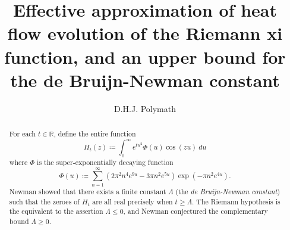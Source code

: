 \documentclass[a4paper,11pt,twoside]{amsart}
\newcommand\R{\mathbb{R}}
\begin{document}
\title[Upper bound for de Bruijn-Newman constant]{Effective approximation of heat flow evolution of the Riemann xi function, and an upper bound for the de Bruijn-Newman constant}

\author{D.H.J. Polymath}
\address{\url{http://michaelnielsen.org/polymath1/index.php}}


\begin{abstract}
For each $t \in \R$, define the entire function
$$ H_t(z) \coloneqq \int_0^\infty e^{tu^2} \Phi(u) \cos(zu)\ du$$
where $\Phi$ is the super-exponentially decaying function
$$ \Phi(u) \coloneqq \sum_{n=1}^\infty (2\pi^2  n^4 e^{9u} - 3\pi n^2 e^{5u} ) \exp(-\pi n^2 e^{4u} ).$$
Newman showed that there exists a finite constant $\Lambda$ (the \emph{de Bruijn-Newman constant}) such that the zeroes of $H_t$ are all real precisely when $t \geq \Lambda$.  The Riemann hypothesis is the equivalent to the assertion $\Lambda \leq 0$, and Newman conjectured the complementary bound $\Lambda \geq 0$.


\end{abstract}


\maketitle





%
\end{document}

